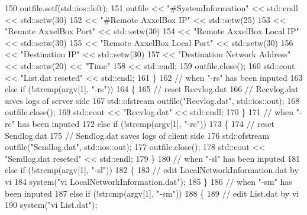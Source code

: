 \begin{DoxyCode}
150         outfile.setf(std::ios::left);
151         outfile << \textcolor{stringliteral}{"#SystemInformation"} << std::endl << std::setw(30)
152                 << \textcolor{stringliteral}{"#Remote AxxelBox IP"} << std::setw(25)
153                 << \textcolor{stringliteral}{"Remote AxxelBox Port"} << std::setw(30)
154                 << \textcolor{stringliteral}{"Remote AxxelBox Local IP"} << std::setw(30)
155                 << \textcolor{stringliteral}{"Remote AxxelBox Local Port"} << std::setw(30)
156                 << \textcolor{stringliteral}{"Destination IP"} << std::setw(30)
157                 << \textcolor{stringliteral}{"Destination Network Address"} << std::setw(20) << \textcolor{stringliteral}{"Time"}
158                 << std::endl;
159         outfile.close();
160         std::cout << \textcolor{stringliteral}{"List.dat reseted"} << std::endl;
161     \}
162     \textcolor{comment}{// when "-rs" has been inputed}
163     \textcolor{keywordflow}{else} \textcolor{keywordflow}{if} (!strcmp(argv[1], \textcolor{stringliteral}{"-rs"}))
164     \{
165         \textcolor{comment}{// reset Recvlog.dat}
166         \textcolor{comment}{// Recvlog.dat saves logs of server side}
167         std::ofstream outfile(\textcolor{stringliteral}{"Recvlog.dat"}, std::ios::out);
168         outfile.close();
169         std::cout << \textcolor{stringliteral}{"Recvlog.dat"} << std::endl;
170     \}
171     \textcolor{comment}{// when "-rc" has been inputed}
172     \textcolor{keywordflow}{else} \textcolor{keywordflow}{if} (!strcmp(argv[1], \textcolor{stringliteral}{"-rc"}))
173     \{
174         \textcolor{comment}{// reset Sendlog.dat}
175         \textcolor{comment}{// Sendlog.dat saves logs of client side}
176         std::ofstream outfile(\textcolor{stringliteral}{"Sendlog.dat"}, std::ios::out);
177         outfile.close();
178         std::cout << \textcolor{stringliteral}{"Sendlog.dat reseted"} << std::endl;
179     \}
180     \textcolor{comment}{// when "-sl" has been inputed}
181     \textcolor{keywordflow}{else} \textcolor{keywordflow}{if} (!strcmp(argv[1], \textcolor{stringliteral}{"-sl"}))
182     \{
183         \textcolor{comment}{// edit LocalNetworkInformation.dat by vi}
184         system(\textcolor{stringliteral}{"vi LocalNetworkInformation.dat"});
185     \}
186     \textcolor{comment}{// when "-sm" has been inputed}
187     \textcolor{keywordflow}{else} \textcolor{keywordflow}{if} (!strcmp(argv[1], \textcolor{stringliteral}{"-sm"}))
188     \{
189         \textcolor{comment}{// edit List.dat by vi}
190         system(\textcolor{stringliteral}{"vi List.dat"});

\end{DoxyCode}
